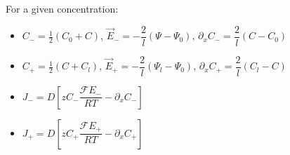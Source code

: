 \documentclass[aps,12pt]{revtex4}
\begin{document}
For a given concentration:
\begin{itemize}
	\item 
	$C_-  = \frac{1}{2}(C_0+C)$, 
	$\vec{E}_- = -\dfrac{2}{l}\left(\Psi-\Psi_0\right) $,
	$\partial_x C_- = \dfrac{2}{l}(C-C_0)$
	\item 
	$C_+  = \frac{1}{2}(C+C_l)$, 
	$\vec{E}_+ = -\dfrac{2}{l}\left(\Psi_l-\Psi_0\right)$,
	 $\partial_x C_+ = \dfrac{2}{l}(C_l-C)$
\end{itemize}

\begin{itemize}
	\item $J_- = D \left[ z C_- \dfrac{\mathcal{F}E_-}{RT} - \partial_x C_-\right]$
	\item $J_+ = D \left[ z C_+ \dfrac{\mathcal{F}E_+}{RT} - \partial_x C_+\right]$
\end{itemize}
\end{document}
